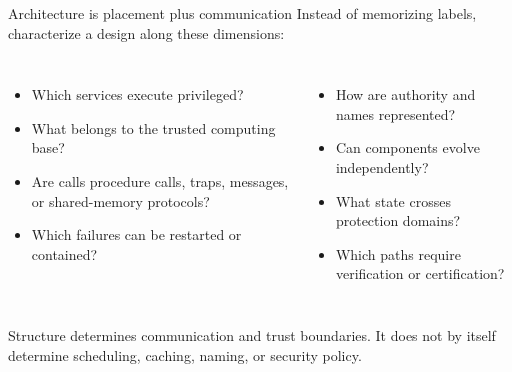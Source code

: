 \documentclass[aspectratio=169,11pt]{beamer}
\begin{document}
\begin{frame}{Architecture is placement plus communication}
  Instead of memorizing labels, characterize a design along these dimensions:
  \begin{columns}[T,onlytextwidth]
      \begin{itemize}
        \item Which services execute privileged?
        \item What belongs to the trusted computing base?
        \item Are calls procedure calls, traps, messages, or shared-memory protocols?
        \item Which failures can be restarted or contained?
      \end{itemize}
      \begin{itemize}
        \item How are authority and names represented?
        \item Can components evolve independently?
        \item What state crosses protection domains?
        \item Which paths require verification or certification?
      \end{itemize}
  \end{columns}
  \begin{tcolorbox}[title=Mechanism--policy separation]
    Structure determines communication and trust boundaries. It does not by itself determine scheduling, caching, naming, or security policy.
  \end{tcolorbox}
\end{frame}
\end{document}
